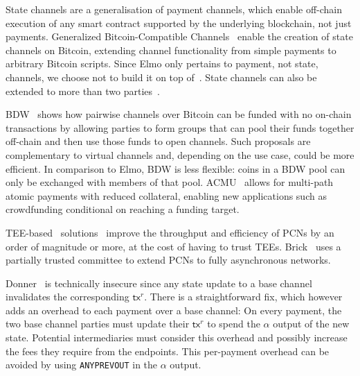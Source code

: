   State channels are a generalisation of payment channels, which enable
  off-chain execution of any smart contract supported by the underlying
  blockchain, not just payments. Generalized Bitcoin-Compatible
  Channels~\cite{DBLP:journals/iacr/AumayrEEFHMMR20} enable the creation of
  state channels on Bitcoin, extending channel functionality from simple
  payments to arbitrary Bitcoin scripts. Since Elmo only pertains to payment,
  not state, channels, we choose not to build it on top
  of~\cite{DBLP:journals/iacr/AumayrEEFHMMR20}. State channels can also be
  extended to more than two
  parties~\cite{DBLP:conf/asiaccs/LiaoZSS22,DBLP:conf/eurocrypt/DziembowskiEFHH19}.

  BDW~\cite{scalable-funding} shows how pairwise channels over Bitcoin can be
  funded with no on-chain transactions by allowing parties to form groups that
  can pool their funds together off-chain and then use those funds to open
  channels. Such proposals are complementary to virtual channels and, depending
  on the use case, could be more efficient. In comparison to Elmo, BDW is less
  flexible: coins in a BDW pool can only be exchanged with members of that
  pool. ACMU~\cite{10.1145/3319535.3345666} allows for multi-path atomic
  payments with reduced collateral, enabling new applications such as
  crowdfunding conditional on reaching a funding target.

  TEE-based~\cite{zhao2019sok}
solutions~\cite{teechan,10.1145/3341301.3359627,DBLP:conf/asiaccs/LiaoZSS22,lee2020routee}
  improve the throughput and efficiency of PCNs by an order of magnitude or
  more, at the cost of having to trust TEEs. Brick~\cite{avarikioti2020brick}
  uses a partially trusted committee to extend PCNs to fully asynchronous
  networks.


  Donner~\cite{donner} is technically insecure since any state update to a base
  channel invalidates the corresponding $\mathsf{tx}^r$. There is a
  straightforward fix, which however adds an overhead to each payment over
  a base channel: On every payment, the two base channel parties must update
  their $\mathsf{tx}^r$ to spend the $\alpha$ output of the new state. Potential
  intermediaries must consider this overhead and possibly increase the fees they
  require from the endpoints. This per-payment overhead can be avoided by using
  \texttt{ANYPREVOUT} in the $\alpha$ output.
